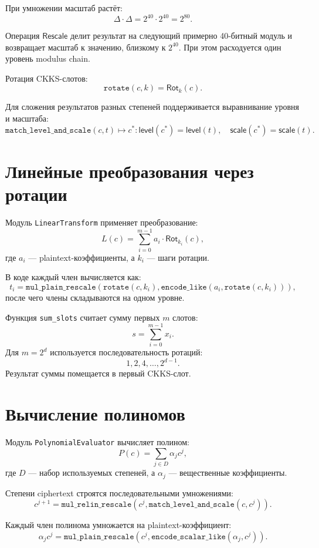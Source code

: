 \documentclass[12pt]{article}
\begin{document}
При умножении масштаб растёт:
\[
    \Delta \cdot \Delta = 2^{40} \cdot 2^{40} = 2^{80}.
\]

Операция \(\mathsf{Rescale}\) делит результат на следующий
примерно 40-битный модуль и возвращает масштаб к значению, близкому к
\(2^{40}\). При этом расходуется один уровень modulus chain.

Ротация CKKS-слотов:
\[
    \texttt{rotate}(c,k) = \mathsf{Rot}_k(c).
\]

Для сложения результатов разных степеней поддерживается выравнивание
уровня и масштаба:
\[
    \texttt{match\_level\_and\_scale}(c,t)
    \mapsto c^*:
    \mathsf{level}(c^*)=\mathsf{level}(t),
    \quad
    \mathsf{scale}(c^*)=\mathsf{scale}(t).
\]

\section*{Линейные преобразования через ротации}

Модуль \texttt{LinearTransform} применяет преобразование:
\[
    L(c)
    =
    \sum_{i=0}^{m-1}
    a_i \cdot \mathsf{Rot}_{k_i}(c),
\]
где \(a_i\) --- plaintext-коэффициенты, а \(k_i\) --- шаги ротации.

В коде каждый член вычисляется как:
\[
    t_i =
    \texttt{mul\_plain\_rescale}
    \left(
        \texttt{rotate}(c,k_i),
        \texttt{encode\_like}(a_i,\texttt{rotate}(c,k_i))
    \right),
\]
после чего члены складываются на одном уровне.

Функция \texttt{sum\_slots} считает сумму первых \(m\) слотов:
\[
    s =
    \sum_{i=0}^{m-1} x_i.
\]
Для \(m=2^d\) используется последовательность ротаций:
\[
    1,2,4,\ldots,2^{d-1}.
\]
Результат суммы помещается в первый CKKS-слот.

\section*{Вычисление полиномов}

Модуль \texttt{PolynomialEvaluator} вычисляет полином:
\[
    P(c)
    =
    \sum_{j \in D} \alpha_j c^j,
\]
где \(D\) --- набор используемых степеней, а \(\alpha_j\) ---
вещественные коэффициенты.

Степени ciphertext строятся последовательными умножениями:
\[
    c^{j+1}
    =
    \texttt{mul\_relin\_rescale}
    \left(
        c^j,
        \texttt{match\_level\_and\_scale}(c,c^j)
    \right).
\]

Каждый член полинома умножается на plaintext-коэффициент:
\[
    \alpha_j c^j
    =
    \texttt{mul\_plain\_rescale}
    \left(
        c^j,
        \texttt{encode\_scalar\_like}(\alpha_j,c^j)
    \right).
\]
\end{document}
